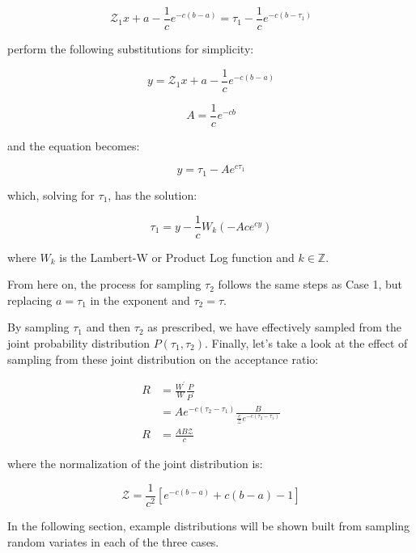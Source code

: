 \documentclass[12pt, two sided]{article}
\begin{document}
\begin{equation}
\mathcal{Z_1} x + a - \frac{1}{c} e^{-c(b-a)} = \tau_1 - \frac{1}{c} e^{-c(b-\tau_1)}
\end{equation}

perform the following substitutions for simplicity:

\begin{equation}
y = \mathcal{Z_1} x + a - \frac{1}{c} e^{-c(b-a)}
\end{equation}

\begin{equation}
A = \frac{1}{c} e^{-cb}
\end{equation}

and the equation becomes:

\begin{equation}
y = \tau_1 - A e^{c \tau_1}
\end{equation}

which, solving for $\tau_1$, has the solution:

\begin{equation}
\tau_1 = y - \frac{1}{c} W_{k}(-Ac e^{cy})
\end{equation}

where $W_{k}$ is the Lambert-W or Product Log function and $k\in\mathbb{Z}$. 

From here on, the process for sampling $\tau_2$ follows the same steps as Case 1, but replacing $a=\tau_1$ in the exponent and $\tau_2=\tau$.

By sampling $\tau_1$ and then $\tau_2$ as prescribed, we have effectively sampled from the joint probability distribution $P(\tau_1,\tau_2)$. Finally, let's take a look at the effect of sampling from these joint distribution on the acceptance ratio:

\begin{align}
R &= \frac{W^\prime}{W} \frac{P}{P^\prime} \\
&= A e^{-c(\tau_2-\tau_1)} \frac{B}{\frac{c}{\mathcal{Z}}e^{-c(\tau_2-\tau_1)}} \\
R &= \frac{A B \mathcal{Z}}{c} 
\end{align}

where the normalization of the joint distribution is:

\begin{equation}
\mathcal{Z} = \frac{1}{c^2} [e^{-c(b-a)}+c(b-a)-1]
\end{equation}

In the following section, example distributions will be shown built from sampling random variates in each of the three cases.
\end{document}
